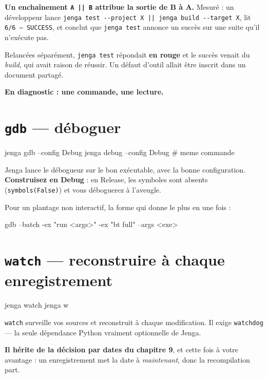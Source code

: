 \begin{nkpiege}
\textbf{Un enchaînement \texttt{A || B} attribue la sortie de B à A.} Mesuré :
un développeur lance \texttt{jenga test -{}-project X || jenga build -{}-target X},
lit \texttt{6/6 --- SUCCESS}, et conclut que \texttt{jenga test} annonce un succès
sur une suite qu'il n'exécute pas.

Relancées séparément, \texttt{jenga test} répondait \textbf{en rouge} et le
succès venait du \emph{build}, qui avait raison de réussir. Un défaut d'outil
allait être inscrit dans un document partagé.

\textbf{En diagnostic : une commande, une lecture.}
\end{nkpiege}

\section{\texttt{gdb} --- déboguer}

\begin{nkcode}{}
jenga gdb --config Debug
jenga debug --config Debug     # meme commande
\end{nkcode}

\begin{nkretenir}
Jenga lance le débogueur sur le bon exécutable, avec la bonne configuration.
\textbf{Construisez en Debug} : en Release, les symboles sont absents
(\texttt{symbols(False)}) et vous déboguerez à l'aveugle.

Pour un plantage non interactif, la forme qui donne le plus en une fois :

\begin{nkcode}{}
gdb --batch -ex "run <args>" -ex "bt full" --args <exe>
\end{nkcode}
\end{nkretenir}

\section{\texttt{watch} --- reconstruire à chaque enregistrement}

\begin{nkcode}{}
jenga watch
jenga w
\end{nkcode}

\begin{nkretenir}
\texttt{watch} surveille vos sources et reconstruit à chaque modification. Il
exige \texttt{watchdog} --- la seule dépendance Python vraiment optionnelle de
Jenga.

\textbf{Il hérite de la décision par dates du chapitre 9}, et cette fois à votre
avantage : un enregistrement met la date à \emph{maintenant}, donc la
recompilation part.
\end{nkretenir}

